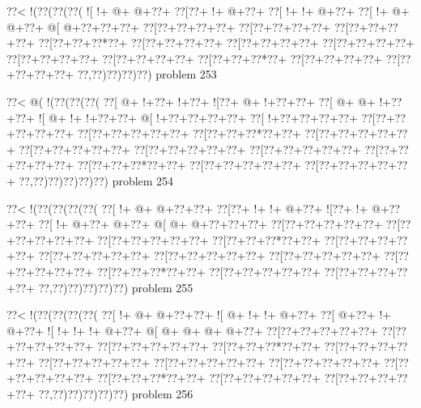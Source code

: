 \vbox{\vbox{\goo
\0??<\- !(\0??(\0??(\0??(
\- ![\- !+\- @+\- @+\0??+
\0??[\0??+\- !+\- @+\0??+
\0??[\- !+\- !+\- @+\0??+
\0??[\- !+\- @+\- @+\0??+
\- @[\- @+\0??+\0??+\0??+
\0??[\0??+\0??+\0??+\0??+
\0??[\0??+\0??+\0??+\0??+
\0??[\0??+\0??+\0??+\0??+
\0??[\0??+\0??+\0??*\0??+
\0??[\0??+\0??+\0??+\0??+
\0??[\0??+\0??+\0??+\0??+
\0??[\0??+\0??+\0??+\0??+
\0??[\0??+\0??+\0??+\0??+
\0??[\0??+\0??+\0??+\0??+
\0??[\0??+\0??+\0??*\0??+
\0??[\0??+\0??+\0??+\0??+
\0??[\0??+\0??+\0??+\0??+
\0??,\0??)\0??)\0??)\0??)
}
\hfil problem 253\hfil\break
}

\vbox{\vbox{\goo
\0??<\- @(\- !(\0??(\0??(\0??(
\0??[\- @+\- !+\0??+\- !+\0??+
\- ![\0??+\- @+\- !+\0??+\0??+
\0??[\- @+\- @+\- !+\0??+\0??+
\- ![\- @+\- !+\- !+\0??+\0??+
\- @[\- !+\0??+\0??+\0??+\0??+
\0??[\- !+\0??+\0??+\0??+\0??+
\0??[\0??+\0??+\0??+\0??+\0??+
\0??[\0??+\0??+\0??+\0??+\0??+
\0??[\0??+\0??+\0??*\0??+\0??+
\0??[\0??+\0??+\0??+\0??+\0??+
\0??[\0??+\0??+\0??+\0??+\0??+
\0??[\0??+\0??+\0??+\0??+\0??+
\0??[\0??+\0??+\0??+\0??+\0??+
\0??[\0??+\0??+\0??+\0??+\0??+
\0??[\0??+\0??+\0??*\0??+\0??+
\0??[\0??+\0??+\0??+\0??+\0??+
\0??[\0??+\0??+\0??+\0??+\0??+
\0??,\0??)\0??)\0??)\0??)\0??)
}
\hfil problem 254\hfil\break
}

\vbox{\vbox{\goo
\0??<\- !(\0??(\0??(\0??(\0??(
\0??[\- !+\- @+\- @+\0??+\0??+
\0??[\0??+\- !+\- !+\- @+\0??+
\- ![\0??+\- !+\- @+\0??+\0??+
\0??[\- !+\- @+\0??+\- @+\0??+
\- @[\- @+\- @+\0??+\0??+\0??+
\0??[\0??+\0??+\0??+\0??+\0??+
\0??[\0??+\0??+\0??+\0??+\0??+
\0??[\0??+\0??+\0??+\0??+\0??+
\0??[\0??+\0??+\0??*\0??+\0??+
\0??[\0??+\0??+\0??+\0??+\0??+
\0??[\0??+\0??+\0??+\0??+\0??+
\0??[\0??+\0??+\0??+\0??+\0??+
\0??[\0??+\0??+\0??+\0??+\0??+
\0??[\0??+\0??+\0??+\0??+\0??+
\0??[\0??+\0??+\0??*\0??+\0??+
\0??[\0??+\0??+\0??+\0??+\0??+
\0??[\0??+\0??+\0??+\0??+\0??+
\0??,\0??)\0??)\0??)\0??)\0??)
}
\hfil problem 255\hfil\break
}

\vbox{\vbox{\goo
\0??<\- !(\0??(\0??(\0??(\0??(
\0??[\- !+\- @+\- @+\0??+\0??+
\- ![\- @+\- !+\- !+\- @+\0??+
\0??[\- @+\0??+\- !+\- @+\0??+
\- ![\- !+\- !+\- !+\- @+\0??+
\- @[\- @+\- @+\- @+\- @+\0??+
\0??[\0??+\0??+\0??+\0??+\0??+
\0??[\0??+\0??+\0??+\0??+\0??+
\0??[\0??+\0??+\0??+\0??+\0??+
\0??[\0??+\0??+\0??*\0??+\0??+
\0??[\0??+\0??+\0??+\0??+\0??+
\0??[\0??+\0??+\0??+\0??+\0??+
\0??[\0??+\0??+\0??+\0??+\0??+
\0??[\0??+\0??+\0??+\0??+\0??+
\0??[\0??+\0??+\0??+\0??+\0??+
\0??[\0??+\0??+\0??*\0??+\0??+
\0??[\0??+\0??+\0??+\0??+\0??+
\0??[\0??+\0??+\0??+\0??+\0??+
\0??,\0??)\0??)\0??)\0??)\0??)
}
\hfil problem 256\hfil\break
}

